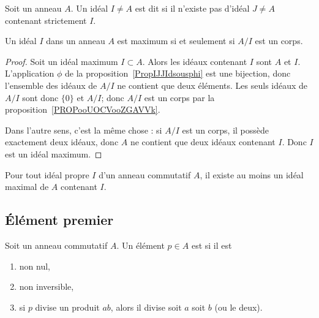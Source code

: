 \begin{definition}      \label{DEFIdealMax}
	Soit un anneau \( A\). Un idéal \( I\neq A\) est dit  si il n'existe pas d'idéal \( J\neq A\) contenant strictement \( I\).
\end{definition}

\begin{proposition}     \label{PROPooSHHWooCyZPPw}
	Un idéal \( I\) dans un anneau \( A \) est maximum si et seulement si \( A/I\) est un corps.
\end{proposition}

\begin{proof}
	Soit un idéal maximum \( I\subset A\). Alors les idéaux contenant \( I\) sont \( A\) et \( I\). L'application \( \phi\) de la proposition~\ref{PropIJJIdsousphi} est une bijection, donc l'ensemble des idéaux de \( A/I\) ne contient que deux éléments. Les seuls idéaux de \( A/I\) sont donc \( \{ 0 \}\) et \( A/I\); donc \( A/I\) est un corps par la proposition~\ref{PROPooUOCVooZGAVVk}.

	Dans l'autre sens, c'est la même chose : si \( A/I\) est un corps, il possède exactement deux idéaux, donc \( A\) ne contient que deux idéaux contenant \( I\). Donc \( I\) est un idéal maximum.
\end{proof}

\begin{theorem}      \label{THOooFWYLooOofaPa}
	Pour tout idéal propre \( I\) d'un anneau commutatif \( A\), il existe au moins un idéal maximal de \( A\) contenant \( I\).
\end{theorem}


\subsection{Élément premier}

\begin{definition}       \label{DEFooZCRQooWXRalw}
	Soit un anneau commutatif \( A\). Un élément \( p\in A\) est  si il est
	\begin{enumerate}
		\item
		      non nul,
		\item
		      non inversible,
		\item       \label{ITEMooPMTTooCVHPIm}
		      si \( p\) divise un produit \( ab\), alors il divise soit \( a\) soit \( b\) (ou le deux).
	\end{enumerate}
\end{definition}

